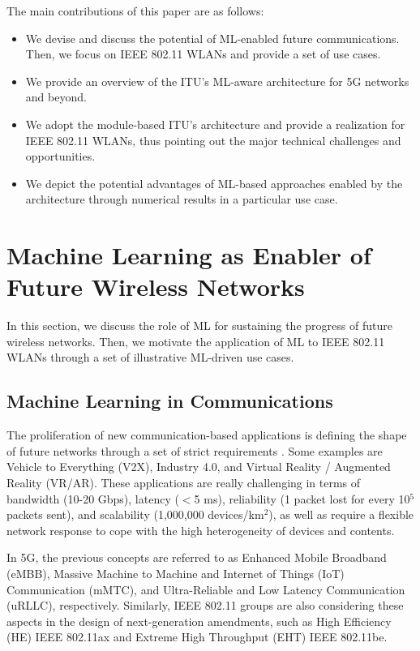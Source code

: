 \documentclass[journal]{IEEEtran}
\begin{document}
The main contributions of this paper are as follows:
\begin{itemize}
	\item We devise and discuss the potential of ML-enabled future communications. Then, we focus on IEEE 802.11 WLANs and provide a set of use cases. 
	\item We provide an overview of the ITU's ML-aware architecture for 5G networks and beyond.
	\item We adopt the module-based ITU's architecture and provide a realization for IEEE 802.11 WLANs, thus pointing out the major technical challenges and opportunities.
	\item We depict the potential advantages of ML-based approaches enabled by the architecture through numerical results in a particular use case.	
\end{itemize}

\section{Machine Learning as Enabler of Future Wireless Networks} 
\label{section:intro_ML}
In this section, we discuss the role of ML for sustaining the progress of future wireless networks. Then, we motivate the application of ML to IEEE 802.11 WLANs through a set of illustrative ML-driven use cases.

\subsection{Machine Learning in Communications}
The proliferation of new communication-based applications is defining the shape of future networks through a set of strict requirements \cite{itu2019use}. Some examples are Vehicle to Everything (V2X), Industry 4.0, and Virtual Reality / Augmented Reality (VR/AR). These applications are really challenging in terms of bandwidth (10-20 Gbps), latency ($<$5 ms), reliability (1 packet lost for every 10$^5$ packets sent), and scalability (1,000,000 devices/km$^2$), as well as require a flexible network response to cope with the high heterogeneity of devices and contents.

In 5G, the previous concepts are referred to as Enhanced Mobile Broadband (eMBB), Massive Machine to Machine and Internet of Things (IoT) Communication (mMTC), and Ultra-Reliable and Low Latency Communication (uRLLC), respectively. Similarly, IEEE 802.11 groups are also considering these aspects in the design of next-generation amendments, such as High Efficiency (HE) IEEE 802.11ax and Extreme High Throughput (EHT) IEEE 802.11be.
\end{document}
